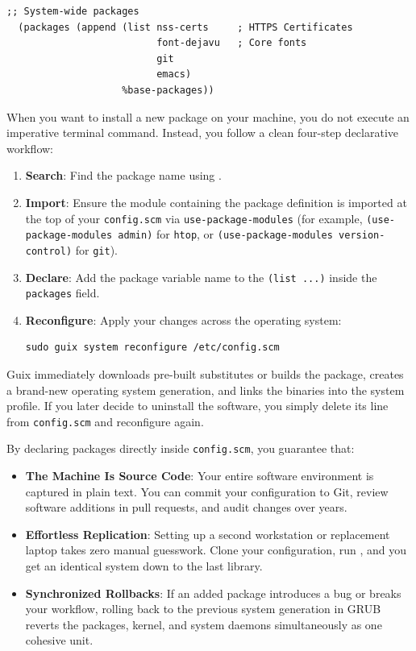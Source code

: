 \begin{lstlisting}[style=guixscheme]
  ;; System-wide packages
  (packages (append (list nss-certs     ; HTTPS Certificates
                          font-dejavu   ; Core fonts
                          git
                          emacs)
                    %base-packages))
\end{lstlisting}

When you want to install a new package on your machine, you do not execute an imperative terminal command. Instead, you follow a clean four-step declarative workflow:

\begin{enumerate}
  \item \textbf{Search}: Find the package name using .
  \item \textbf{Import}: Ensure the module containing the package definition is imported at the top of your \texttt{config.scm} via \texttt{use-package-modules} (for example, \texttt{(use-package-modules admin)} for \texttt{htop}, or \texttt{(use-package-modules version-control)} for \texttt{git}).
  \item \textbf{Declare}: Add the package variable name to the \texttt{(list ...)} inside the \texttt{packages} field.
  \item \textbf{Reconfigure}: Apply your changes across the operating system:
\begin{lstlisting}[style=guixcli]
sudo guix system reconfigure /etc/config.scm
\end{lstlisting}
\end{enumerate}

Guix immediately downloads pre-built substitutes or builds the package, creates a brand-new operating system generation, and links the binaries into the system profile. If you later decide to uninstall the software, you simply delete its line from \texttt{config.scm} and reconfigure again.

\begin{alchemybox}
By declaring packages directly inside \texttt{config.scm}, you guarantee that:
\begin{itemize}
  \item \textbf{The Machine Is Source Code}: Your entire software environment is captured in plain text. You can commit your configuration to Git, review software additions in pull requests, and audit changes over years.
  \item \textbf{Effortless Replication}: Setting up a second workstation or replacement laptop takes zero manual guesswork. Clone your configuration, run , and you get an identical system down to the last library.
  \item \textbf{Synchronized Rollbacks}: If an added package introduces a bug or breaks your workflow, rolling back to the previous system generation in GRUB reverts the packages, kernel, and system daemons simultaneously as one cohesive unit.
\end{itemize}
\end{alchemybox}

